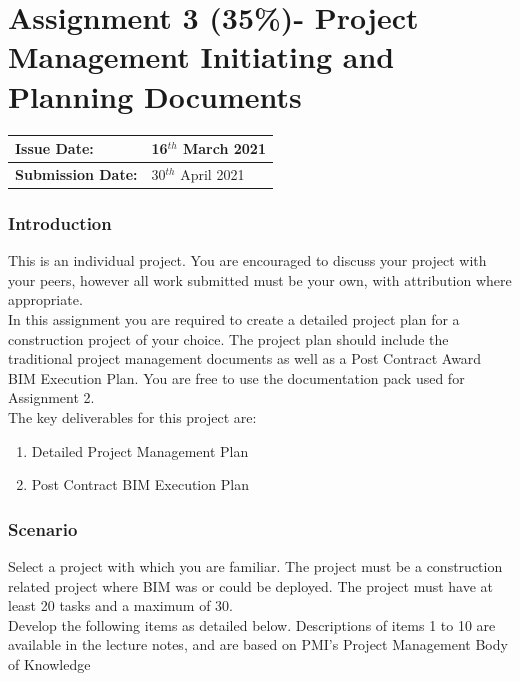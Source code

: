 
	

\part*{Assignment 3 (35\%)- Project Management Initiating and Planning Documents}


\begin{tabularx}{\textwidth}{ |X|X| }
	\hline
	\textbf{Issue Date:} & 16$^{th}$ March 2021\\
	\hline 
	\textbf{Submission Date:}  & 30$^{th}$ April 2021\\
	\hline
\end{tabularx}

\section*{Introduction}

This is an individual project.  You are encouraged to discuss your project with your peers, however all work submitted must be your own, with attribution where appropriate.\\

In this assignment you are required to create a detailed project plan for a construction project of your choice.  The project plan should include the traditional project management documents as well as a Post Contract Award BIM Execution Plan.  You are free to use the documentation pack used for Assignment 2.\\

The key deliverables for this project are:

\begin{enumerate}
	\item Detailed Project Management Plan 
	\item Post Contract BIM Execution Plan
\end{enumerate}


\section*{Scenario}

Select a project with which you are familiar. The project must be a construction related project where BIM was or could be deployed.  The project must have at least 20 tasks and a maximum of 30.\\

Develop the following items as detailed below. Descriptions of items 1 to 10 are available in the lecture notes, and are based on PMI's Project Management Body of Knowledge\\

